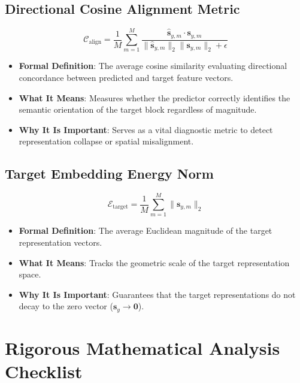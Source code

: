 \documentclass[11pt,a4paper]{article}
\theoremstyle{definition}
\begin{document}
\subsection{Directional Cosine Alignment Metric}
{\boldmath
\begin{equation}
\mathcal{C}_{\text{align}} = \frac{1}{M} \sum_{m=1}^M \frac{\hat{\mathbf{s}}_{y, m} \cdot \mathbf{s}_{y, m}}{\|\hat{\mathbf{s}}_{y, m}\|_2 \|\mathbf{s}_{y, m}\|_2 + \epsilon}
\end{equation}
}
\begin{itemize}
    \item \textbf{Formal Definition}: The average cosine similarity evaluating directional concordance between predicted and target feature vectors.
    \item \textbf{What It Means}: Measures whether the predictor correctly identifies the semantic orientation of the target block regardless of magnitude.
    \item \textbf{Why It Is Important}: Serves as a vital diagnostic metric to detect representation collapse or spatial misalignment.
\end{itemize}

\subsection{Target Embedding Energy Norm}
{\boldmath
\begin{equation}
\mathcal{E}_{\text{target}} = \frac{1}{M} \sum_{m=1}^M \|\mathbf{s}_{y, m}\|_2
\end{equation}
}
\begin{itemize}
    \item \textbf{Formal Definition}: The average Euclidean magnitude of the target representation vectors.
    \item \textbf{What It Means}: Tracks the geometric scale of the target representation space.
    \item \textbf{Why It Is Important}: Guarantees that the target representations do not decay to the zero vector ($\mathbf{s}_y \to \mathbf{0}$).
\end{itemize}

\section{Rigorous Mathematical Analysis Checklist}
\end{document}
